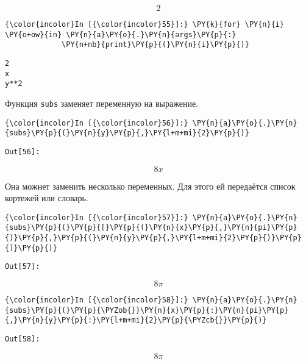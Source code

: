     \[2\]

    

    \begin{Verbatim}[commandchars=\\\{\}]
{\color{incolor}In [{\color{incolor}55}]:} \PY{k}{for} \PY{n}{i} \PY{o+ow}{in} \PY{n}{a}\PY{o}{.}\PY{n}{args}\PY{p}{:}
             \PY{n+nb}{print}\PY{p}{(}\PY{n}{i}\PY{p}{)}
\end{Verbatim}

    \begin{Verbatim}[commandchars=\\\{\}]
2
x
y**2

    \end{Verbatim}

    Функция \texttt{subs} заменяет переменную на выражение.

    \begin{Verbatim}[commandchars=\\\{\}]
{\color{incolor}In [{\color{incolor}56}]:} \PY{n}{a}\PY{o}{.}\PY{n}{subs}\PY{p}{(}\PY{n}{y}\PY{p}{,}\PY{l+m+mi}{2}\PY{p}{)}
\end{Verbatim}
\texttt{\color{outcolor}Out[{\color{outcolor}56}]:}
    
    \[8 x\]

    

    Она можнет заменить несколько переменных. Для этого ей передаётся список
кортежей или словарь.

    \begin{Verbatim}[commandchars=\\\{\}]
{\color{incolor}In [{\color{incolor}57}]:} \PY{n}{a}\PY{o}{.}\PY{n}{subs}\PY{p}{(}\PY{p}{[}\PY{p}{(}\PY{n}{x}\PY{p}{,}\PY{n}{pi}\PY{p}{)}\PY{p}{,}\PY{p}{(}\PY{n}{y}\PY{p}{,}\PY{l+m+mi}{2}\PY{p}{)}\PY{p}{]}\PY{p}{)}
\end{Verbatim}
\texttt{\color{outcolor}Out[{\color{outcolor}57}]:}
    
    \[8 \pi\]

    

    \begin{Verbatim}[commandchars=\\\{\}]
{\color{incolor}In [{\color{incolor}58}]:} \PY{n}{a}\PY{o}{.}\PY{n}{subs}\PY{p}{(}\PY{p}{\PYZob{}}\PY{n}{x}\PY{p}{:}\PY{n}{pi}\PY{p}{,}\PY{n}{y}\PY{p}{:}\PY{l+m+mi}{2}\PY{p}{\PYZcb{}}\PY{p}{)}
\end{Verbatim}
\texttt{\color{outcolor}Out[{\color{outcolor}58}]:}
    
    \[8 \pi\]


